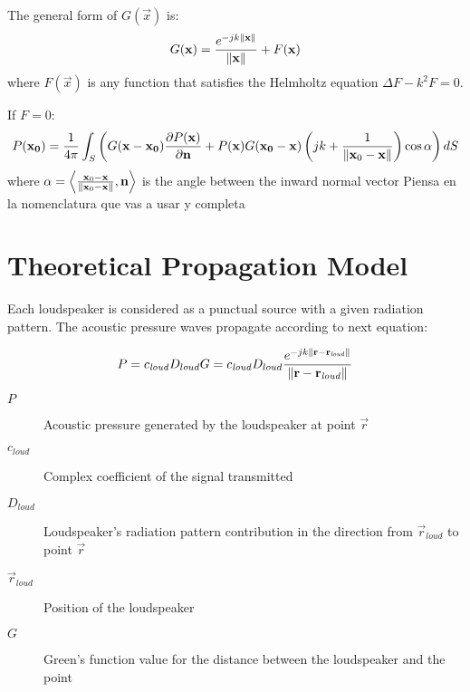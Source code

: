 The general form of $G(\vec{x})$ is:
\begin{equation}
G(\mathbf{x}) = \frac{e^{-jk\left\| \mathbf{x} \right\|}}{\left\| \mathbf{x} \right\|} + F(\mathbf{x})
\label{GreensFunction}
\end{equation}
where $F(\vec{x})$ is any function that satisfies the Helmholtz equation $\Delta F - k^2 F = 0$.

If $F = 0$:
\begin{equation}
P(\mathbf{x_0}) = \frac{1}{4\pi} \int_{S} \left(G(\mathbf{x} - \mathbf{x_0}) \frac{\partial P(\mathbf{x})}{\partial \mathbf{n}} + P(\mathbf{x}) G(\mathbf{x_0} - \mathbf{x})\left(jk + \frac{1}{\left\| \mathbf{x}_0 - \mathbf{x} \right\|}\right)\cos\alpha \right) dS
\end{equation}
where $\alpha = \left\langle \frac{\mathbf{x}_0 - \mathbf{x}}{\left\| \mathbf{x}_0 - \mathbf{x} \right\|} , \mathbf{n} \right\rangle$ is the angle between the inward normal vector Piensa en la nomenclatura que vas a usar y completa


\section{Theoretical Propagation Model}
\label{TheoreticalModelLabel}

Each loudspeaker is considered as a punctual source with a given radiation pattern. The acoustic pressure waves propagate according to next equation:

\begin{equation}
P = c_\mathit{loud} D_{loud} G = c_\mathit{loud} D_{loud} \frac{e^{-j k \left\| \mathbf{r} - \mathbf{r}_\mathit{loud} \right\|}}{\left\| \mathbf{r} - \mathbf{r}_\mathit{loud} \right\|}
\end{equation}

\begin{description}
	\item[$P$] Acoustic pressure generated by the loudspeaker at point $\vec{r}$
	\item[$c_\mathit{loud}$] Complex coefficient of the signal transmitted %
	\item[$D_{loud}$] Loudspeaker's radiation pattern contribution in the direction from $\vec{r}_\mathit{loud}$ to point $\vec{r}$%
	\item[$\vec{r}_{\mathit{loud}}$] Position of the loudspeaker
	\item[$G$] Green's function value for the distance between the loudspeaker and the point %
\end{description}

